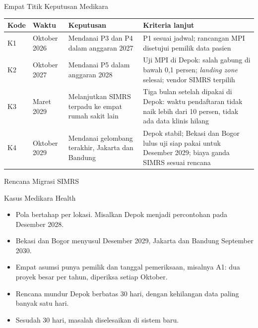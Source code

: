 \documentclass[aspectratio=169, table, 12pt]{beamer}
\begin{document}
\begin{frame}{{\Large Empat Titik Keputusan Medikara}}
  \scriptsize
  \begin{tabularx}{\textwidth}{lL{1.7cm}YY}
    \hline
    \textbf{Kode} & \textbf{Waktu} & \textbf{Keputusan} & \textbf{Kriteria lanjut} \\
    \hline
    K1 & Oktober 2026 & Mendanai P3 dan P4 dalam anggaran 2027 & P1 sesuai
      jadwal; rancangan MPI disetujui pemilik data pasien \\
    \hline
    K2 & Oktober 2027 & Mendanai P5 dalam anggaran 2028 & Uji MPI di Depok:
      salah gabung di bawah 0,1 persen; \textit{landing zone} selesai; vendor
      SIMRS terpilih \\
    \hline
    K3 & Maret 2029 & Melanjutkan SIMRS terpadu ke empat rumah sakit lain &
      Tiga bulan setelah dipakai di Depok: waktu pendaftaran tidak naik lebih
      dari 10 persen, tidak ada data klinis hilang \\
    \hline
    K4 & Oktober 2029 & Mendanai gelombang terakhir, Jakarta dan Bandung &
      Depok stabil; Bekasi dan Bogor lulus uji siap pakai untuk Desember 2029;
      biaya ganda SIMRS sesuai rencana \\
    \hline
  \end{tabularx}
\end{frame}

\begin{frame}{{\Large Rencana Migrasi SIMRS}}
  \begin{block}{Kasus Medikara Health}
    \small
    \begin{itemize}
      \item Pola bertahap per lokasi. Misalkan Depok menjadi percontohan pada Desember 2028.
      \item Bekasi dan Bogor menyusul Desember 2029, Jakarta dan Bandung September 2030.
      \item Empat asumsi punya pemilik dan tanggal pemeriksaan, misalnya A1: dua proyek besar per
            tahun, diperiksa setiap Oktober.
      \item Rencana mundur Depok berbatas 30 hari, dengan kehilangan data paling banyak satu hari.
      \item Sesudah 30 hari, masalah diselesaikan di sistem baru.
    \end{itemize}
  \end{block}
\end{frame}
\end{document}
